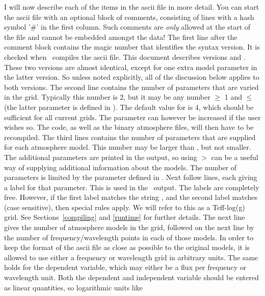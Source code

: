I will now describe each of the items in the ascii file in more detail. You
can start the ascii file with an optional block of comments, consisting of
lines with a hash symbol '\#' in the first column. Such comments are {\em only}
allowed at the start of the file and cannot be embedded amongst the data! The
first line after the comment block contains the magic number that identifies
the syntax version. It is checked
when \Cloudy\ compiles the ascii file. This document describes versions
 and . These two versions are
almost identical, except for one extra model parameter in the latter version.
So unless noted explicitly, all of the discussion below applies to both
versions. The second line contains the number of parameters
 that are varied in the grid. Typically this number is 2, but
it may be any number $\geq$ 1 and $\leq$  (the latter
parameter is defined in ). The default value for
 is 4, which should be sufficient for all current grids. The
parameter can however be increased if the user wishes so. The code, as well as
the binary atmosphere files, will then have to be recompiled. The third lines
contains the number of parameters  that are supplied for each
atmosphere model. This number may be larger than , but not
smaller. The additional parameters are printed in the output, so using
 $>$  can be a useful way of supplying
additional information about the models. The number of parameters is limited
by the parameter  defined in . Next
follow  lines, each giving a label for that parameter. This
is used in the \Cloudy\ output. The labels are completely free. However, if the
first label matches the string , and the second label matches
 (case sensitive), then special rules apply. We will refer
to this as a Teff-log(g) grid. See Sections~\ref{compiling} and \ref{runtime}
for further details. The next line gives the number of atmosphere models
 in the grid, followed on the next line by the number of
frequency/wavelength points  in each of those models. In
order to keep the format of the ascii file as close as possible to the
original models, it is allowed to use either a frequency or wavelength grid in
arbitrary units. The same holds for the dependent variable, which may either
be a flux per frequency or wavelength unit. Both the dependent and independent
variable should be entered as linear quantities, so logarithmic units like
